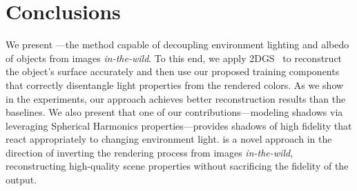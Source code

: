 \section{Conclusions}
  \label{sec:lumigauss-conclusions}

  We present \lumigauss---the method capable of decoupling environment
  lighting and albedo of objects from images \textit{in-the-wild}.
  To this end, we apply 2DGS~\cite{huang20242d} to reconstruct the object's
  surface accurately and then use our proposed training components that
  correctly disentangle light properties from the rendered colors.
  As we show in the experiments, our approach achieves better reconstruction
  results than the baselines.
  We also present that one of our contributions---modeling shadows via
  leveraging Spherical Harmonics properties---provides shadows of high
  fidelity that react appropriately to changing environment light.
  \lumigauss is a novel approach in the direction of inverting the rendering process from images \textit{in-the-wild}, reconstructing high-quality scene properties without sacrificing the fidelity of the output.